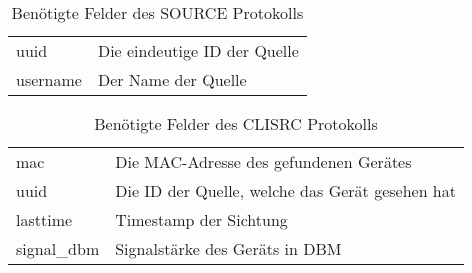 \documentclass[a4paper]{spie}  %
\begin{document}
\begin{table}[!h]
	\centering
	\begin{tabular}{ | p{} | p{} | }
		\hline 
		\rowcolor{blau} \multicolumn{2}{l|}{\textcolor{white}{\textbf{SOURCE}}}  \\ \hline
		uuid & Die eindeutige ID der Quelle \\ \hline
		username & Der Name der Quelle \\
		\hline
	\end{tabular}
	\caption{Benötigte Felder des SOURCE Protokolls}
	\label{tab:src}
\end{table}

\begin{table}[!h]
	\centering
	\begin{tabular}{ | p{} | p{} | }
		\hline
		\rowcolor{blau} \multicolumn{2}{l|}{\textcolor{white}{\textbf{CLISRC}}}  \\ \hline
		mac & Die MAC-Adresse des gefundenen Gerätes \\ \hline
		uuid & Die ID der Quelle, welche das Gerät gesehen hat \\ \hline
		lasttime & Timestamp der Sichtung \\ \hline
		signal\_dbm & Signalstärke des Geräts in DBM \\
		\hline
	\end{tabular}
	\caption{Benötigte Felder des CLISRC Protokolls}
	\label{tab:cli}
\end{table}
\end{document}
